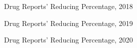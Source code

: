 \documentclass{mcmthesis}
\numberwithin{equation}{section}
\numberwithin{figure}{section}
\numberwithin{table}{section}
\theoremstyle{mydef}
\begin{document}
\begin{figure}[!htbp]
  \caption{Drug Reports' Reducing Percentage, 2018}\label{figpre18}
\end{figure}
\begin{figure}[!htbp]
  \caption{Drug Reports' Reducing Percentage, 2019}\label{figpre19}
\end{figure}
\begin{figure}[!htbp]
  \caption{Drug Reports' Reducing Percentage, 2020}\label{figpre20}
\end{figure}
\end{document}
